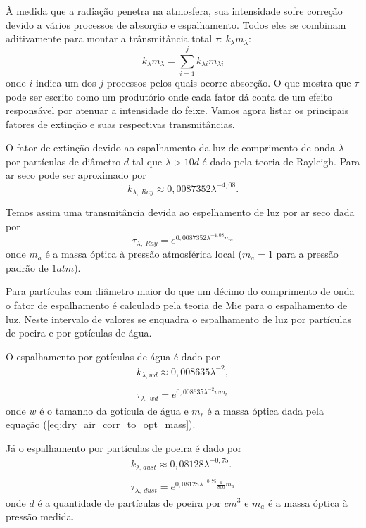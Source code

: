 \documentclass[12pt,a4paper]{article}
\begin{document}
	À medida que a radiação penetra na atmosfera, sua intensidade sofre
	correção devido a vários processos de absorção e espalhamento. Todos eles
	se combinam aditivamente para montar a trânsmitância total  $\tau$:
	$k_{\lambda}m_{\lambda}$:
	\begin{equation}
		k_{\lambda}m_{\lambda} = \sum_{i=1}^{j} k_{\lambda i}m_{\lambda i}
	\end{equation}
	onde $i$ indica um dos $j$ processos pelos quais ocorre absorção.
	O que mostra que $\tau$ pode ser escrito como um produtório onde cada fator 
	dá conta de um efeito responsável por atenuar a intensidade do feixe.
	Vamos agora listar os principais fatores de extinção e suas respectivas 
	transmitâncias.

	O fator de extinção devido ao espalhamento da luz de comprimento de onda $\lambda$ 
	por partículas de diâmetro $d$ tal que $\lambda > 10 d$ é dado pela teoria de Rayleigh.
	Para ar seco pode ser aproximado por 
	\begin{equation}
		k_{\lambda,\ Ray} \approx 0,0087352\lambda^{-4,08}. \label{eq:dry_air_extinc_fac_scat_rayl}
	\end{equation}

	Temos assim uma transmitância devida ao espelhamento de luz por ar seco dada por
	\begin{equation}
		\tau_{\lambda,\ Ray} = e^{0,0087352\lambda^{-4,08}m_a} \label{eq:dry_air_rayl_scat_transm}
	\end{equation}
	onde $m_a$ é a massa óptica à pressão atmosférica local ($m_a=1$ para a pressão padrão de $1atm$).

	Para partículas com diâmetro maior do que um décimo do comprimento de onda
	o fator de espalhamento é calculado pela teoria de Mie para o espalhamento
	de luz. Neste intervalo de valores se enquadra o espalhamento de luz por
	partículas de poeira e por gotículas de água.

	O espalhamento por gotículas de água é dado por
	\begin{eqnarray}
		k_{\lambda, wd} \approx 0,008635\lambda^{-2},\\
		\nonumber \\
		\tau_{\lambda,\ wd} = e^{0,008635\lambda^{-2}w m_r}  \label{eq:wat_droplets_scat_transm}
	\end{eqnarray}
	onde $w$ é o tamanho da gotícula de água e $m_r$ é a massa óptica
	dada pela equação (\ref{eq:dry_air_corr_to_opt_mass}).

	Já o espalhamento por partículas de poeira é dado por
	\begin{eqnarray}
		k_{\lambda, dust} \approx 0,08128\lambda^{-0,75}.\\
		\nonumber \\
		\tau_{\lambda,\ dust} = e^{0,08128\lambda^{-0,75}\frac{d}{800}m_a}   \label{eq:dust_scat_transm}
	\end{eqnarray}
	onde $d$ é a quantidade de partículas de poeira por $cm^3$ e $m_a$ é a 
	massa óptica à pressão medida.
\end{document}
